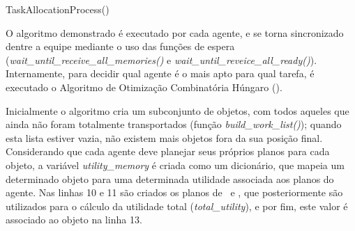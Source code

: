 \begin{algorithm}
  \caption[TaskAllocationProcess]{TaskAllocationProcess(\objectset)}
  \label{alg:task_allocation}

  \begin{algorithmic}[1]
    \LOOP

      \IF{$\workobjectset = \emptyset $}
      \ENDIF
      \STATE{}




      \ENDFOR
      \STATE{}

      \STATE{}


      \STATE{}

    \ENDLOOP
  \end{algorithmic}
\end{algorithm}

O algoritmo demonstrado é executado por cada agente, e se torna sincronizado dentre a equipe mediante o uso das funções de espera (\textit{wait\_until\_receive\_all\_memories()} e \textit{wait\_until\_reveice\_all\_ready()}).
Internamente, para decidir qual agente é o mais apto para qual tarefa, é executado o Algoritmo de Otimização Combinatória Húngaro (\cite{Munkres1957}).

Inicialmente o algoritmo cria um subconjunto de objetos, com todos aqueles que ainda não foram totalmente transportados (função \emph{build\_work\_list()}); quando esta lista estiver vazia, não existem mais objetos fora da sua posição final.
Considerando que cada agente deve planejar seus próprios planos para cada objeto, a variável \emph{utility\_memory} é criada como um dicionário, que mapeia um determinado objeto para uma determinada utilidade associada aos planos do agente.
Nas linhas 10 e 11 são criados os planos de \movementtypepremove\ e \movementtypemove, que posteriormente são utilizados para o cálculo da utilidade total (\emph{total\_utility}), e por fim, este valor é associado ao objeto na linha 13.

